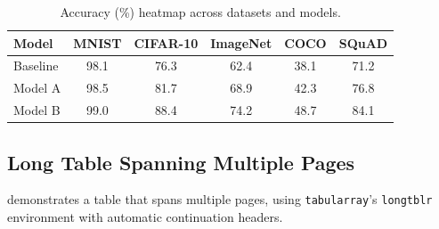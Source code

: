 \documentclass[
    language=english,
    doctype=article,
    institution=none,
    titlestyle=book,
]{../../omnilatex}
\theoremstyle{definition}
\theoremstyle{definition}
\theoremstyle{remark}
\begin{document}
\begin{table}[htbp]
    \centering
    \caption{Accuracy (\%) heatmap across datasets and models.}
    \label{tab:heatmap-table}
    \begin{tabular}{@{}l*{5}{c}@{}}
        \toprule
        \textbf{Model}
            & \textbf{MNIST} & \textbf{CIFAR-10}
            & \textbf{ImageNet} & \textbf{COCO} & \textbf{SQuAD} \\
        \midrule
        Baseline
            & \cellcolor{heathigh}98.1
            & \cellcolor{heatmid}76.3
            & \cellcolor{heatlow}62.4
            & \cellcolor{heatlow}38.1
            & \cellcolor{heatmid}71.2 \\
        Model A
            & \cellcolor{heathigh}98.5
            & \cellcolor{heatmid}81.7
            & \cellcolor{heatmid}68.9
            & \cellcolor{heatlow}42.3
            & \cellcolor{heatmid}76.8 \\
        Model B
            & \cellcolor{heathigh}99.0
            & \cellcolor{heathigh}88.4
            & \cellcolor{heatmid}74.2
            & \cellcolor{heatmid}48.7
            & \cellcolor{heathigh}84.1 \\
        \bottomrule
    \end{tabular}
\end{table}


\subsection{Long Table Spanning Multiple Pages}
\label{sec:longtable}

 demonstrates a table that spans multiple pages, using
\texttt{tabularray}'s \texttt{longtblr} environment with automatic
continuation headers.
\end{document}
